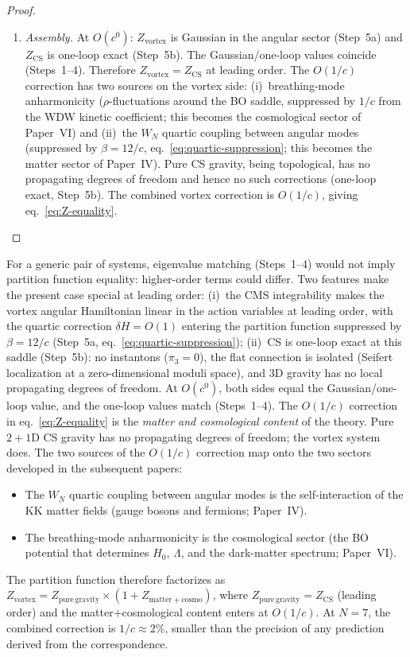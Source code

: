 \begin{proof}
\begin{enumerate}
\item[\emph{6.}] \emph{Assembly.}
  At $O(c^0)$:
  $Z_{\mathrm{vortex}}$ is Gaussian in the angular
  sector (Step~5a) and
  $Z_{\mathrm{CS}}$ is one-loop exact (Step~5b).
  The Gaussian/one-loop values coincide (Steps~1--4).
  Therefore $Z_{\mathrm{vortex}} = Z_{\mathrm{CS}}$
  at leading order.
  The $O(1/c)$ correction has two sources on the
  vortex side: (i)~breathing-mode anharmonicity
  ($\rho$-fluctuations around the BO saddle, suppressed
  by $1/c$ from the WDW kinetic coefficient;
  this becomes the cosmological sector of Paper~VI) and
  (ii)~the $W_N$ quartic coupling between angular modes
  (suppressed by $\beta = 12/c$,
  eq.~\eqref{eq:quartic-suppression};
  this becomes the matter sector of Paper~IV).
  Pure CS gravity, being topological, has no
  propagating degrees of freedom and hence no
  such corrections (one-loop exact, Step~5b).
  The combined vortex correction is $O(1/c)$,
  giving eq.~\eqref{eq:Z-equality}.
\end{enumerate}
\end{proof}

\begin{remark}
\label{rmk:why-theorem}
For a generic pair of systems, eigenvalue matching
(Steps~1--4) would not imply partition function
equality: higher-order terms could differ.
Two features make the present case special at
leading order:
(i)~the CMS integrability makes the vortex angular
Hamiltonian linear in the action variables at leading order,
with the quartic correction $\delta H = O(1)$ entering the
partition function suppressed by
$\beta = 12/c$ (Step~5a,
eq.~\eqref{eq:quartic-suppression});
(ii)~CS is one-loop exact at this saddle (Step~5b):
no instantons ($\pi_3 = 0$), the flat connection is
isolated (Seifert localization at a zero-dimensional
moduli space), and 3D gravity has no local
propagating degrees of freedom.
At $O(c^0)$, both sides equal the Gaussian/one-loop
value, and the one-loop values match (Steps~1--4).
The $O(1/c)$ correction in eq.~\eqref{eq:Z-equality}
is the \emph{matter and cosmological content}
of the theory.
Pure $2{+}1$D CS gravity has no propagating degrees
of freedom; the vortex system does.
The two sources of the $O(1/c)$ correction map onto
the two sectors developed in the subsequent papers:
\begin{itemize}
\item The $W_N$ quartic coupling between angular modes
  is the self-interaction of the KK matter fields
  (gauge bosons and fermions; Paper~IV).
\item The breathing-mode anharmonicity is the
  cosmological sector
  (the BO potential that determines $H_0$,
  $\Lambda$, and the dark-matter spectrum; Paper~VI).
\end{itemize}
The partition function therefore factorizes as
$Z_{\mathrm{vortex}}
= Z_{\mathrm{pure\,gravity}}
\times (1 + Z_{\mathrm{matter+cosmo}})$,
where $Z_{\mathrm{pure\,gravity}} = Z_{\mathrm{CS}}$
(leading order) and the matter$+$cosmological
content enters at $O(1/c)$.
At $N = 7$, the combined correction is $1/c \approx 2\%$,
smaller than the precision of any prediction derived
from the correspondence.
\end{remark}

